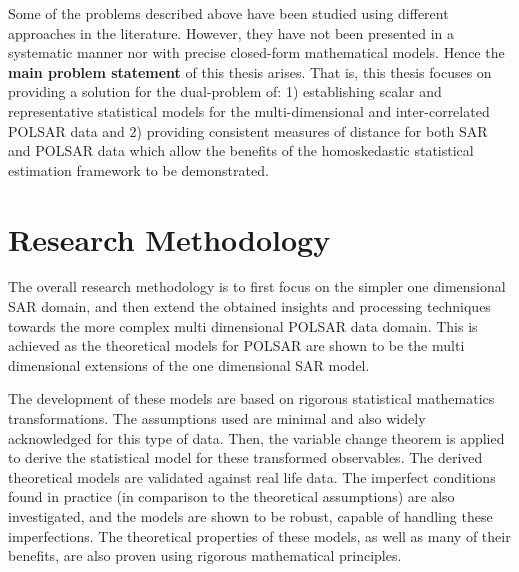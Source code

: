 Some of the problems described above have been studied using different approaches in the literature.
However, they have not been presented in a systematic manner nor with precise closed-form mathematical models.
Hence the \textbf{main problem statement} of this thesis arises. %
That is,
                this thesis focuses on providing a solution for the
                dual-problem of: 1) establishing scalar and
                representative statistical models for the
                multi-dimensional and inter-correlated POLSAR data and
                2) providing consistent measures of distance for both
                SAR and POLSAR data which allow the benefits of the
                homoskedastic statistical estimation framework to be
                demonstrated.

\section{Research Methodology}
The
                overall research methodology is to first focus on the
                simpler one dimensional SAR domain, and then extend the
                obtained insights and processing techniques 
towards the more complex multi dimensional
                POLSAR data domain.
This
                is achieved as the theoretical models for
                POLSAR are shown to be the multi dimensional extensions of
                the one dimensional SAR model.

The
                development of these models are based on
                rigorous statistical mathematics transformations. %
The
                assumptions used are minimal and also widely
                acknowledged for this type of data.
Then, the variable change theorem is applied to derive the statistical model for these transformed observables. %
The
                derived theoretical models are validated against
                real life data.
The
                imperfect conditions found in practice (in
                comparison to the theoretical assumptions) are also
                investigated, and the models are shown to be robust, capable of
                handling these imperfections.
The
                theoretical properties of these models, as well as many
                of their benefits, are also proven using rigorous
                mathematical principles.

